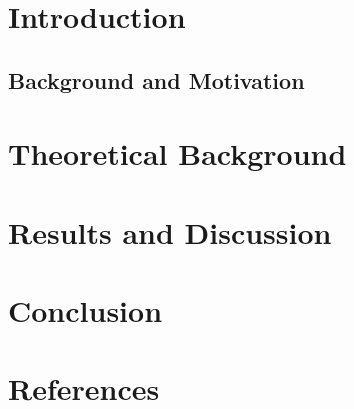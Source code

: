	\pagebreak
	
	\listoffigures
	
	\pagebreak
	
	\listoftables
	
	\pagebreak
	
	\tableofcontents
	
	\pagebreak
	
	\section{Introduction}
		\subsection{Background and Motivation}
		
	\section{Theoretical Background}
	
	\section{Results and Discussion}
	
	\section{Conclusion}
	
	\section{References}
